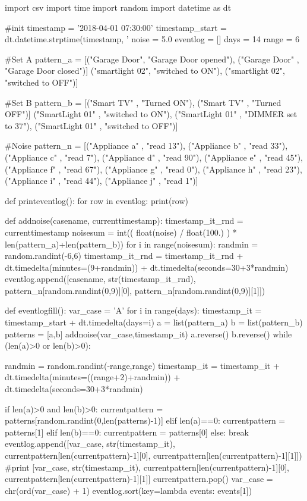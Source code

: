 import csv
import time
import random
import datetime as dt

#init
timestamp = '2018-04-01 07:30:00'
timestamp_start = dt.datetime.strptime(timestamp, '%
noise = 5.0
eventlog = []
days = 14
range = 6

#Set A
pattern_a = [("Garage Door", "Garage Door opened"),
("Garage Door" , "Garage Door closed")]
("smartlight 02", "switched to ON"), 
("smartlight 02", "switched to OFF")]

#Set B
pattern_b = [("Smart TV" , "Turned ON"),
("Smart TV" , "Turned OFF")]
("SmartLight 01" , "switched to ON"),
("SmartLight 01" , "DIMMER set to 37"),
("SmartLight 01" , "switched to OFF")]

#Noise
pattern_n =  [("Appliance a" , "read 13"),
("Appliance b" , "read 33"),
("Appliance c" , "read 7"),
("Appliance d" , "read 90"),
("Appliance e" , "read 45"),
("Appliance f" , "read 67"),
("Appliance g" , "read 0"),
("Appliance h" , "read 23"),
("Appliance i" , "read 44"),
("Appliance j" , "read 1")]

def printeventlog():
    for row in eventlog:
        print(row)

def addnoise(casename, currenttimestamp):
    timestamp_it_rnd = currenttimestamp
    noisesum = int(( float(noise) / float(100.) ) * len(pattern_a)+len(pattern_b))
    for i in range(noisesum):
        randmin = random.randint(-6,6)
        timestamp_it_rnd = timestamp_it_rnd + dt.timedelta(minutes=(9+randmin)) + dt.timedelta(seconds=30+3*randmin)
        eventlog.append([casename, str(timestamp_it_rnd), pattern_n[random.randint(0,9)][0], pattern_n[random.randint(0,9)][1]])
        
def eventlogfill():
    var_case = 'A'
    for i in range(days):
        timestamp_it = timestamp_start + dt.timedelta(days=i)
        a = list(pattern_a)
        b = list(pattern_b)
        patterns = [a,b]
        addnoise(var_case,timestamp_it)
        a.reverse()
        b.reverse()
        while (len(a)>0 or len(b)>0):
            
            randmin = random.randint(-range,range)
            timestamp_it = timestamp_it + dt.timedelta(minutes=((range+2)+randmin)) + dt.timedelta(seconds=30+3*randmin)

            if len(a)>0 and len(b)>0:
                currentpattern = patterns[random.randint(0,len(patterns)-1)]
            elif len(a)==0:
                currentpattern = patterns[1]
            elif len(b)==0:
                currentpattern = patterns[0]
            else:
                break
            eventlog.append([var_case, str(timestamp_it), currentpattern[len(currentpattern)-1][0],  currentpattern[len(currentpattern)-1][1]])
            #print [var_case, str(timestamp_it), currentpattern[len(currentpattern)-1][0],  currentpattern[len(currentpattern)-1][1]]
            currentpattern.pop()
        var_case = chr(ord(var_case) + 1)
    eventlog.sort(key=lambda events: events[1])

